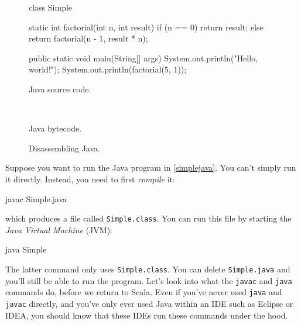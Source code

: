 \begin{figure}
\begin{minipage}{0.45\textwidth}
\begin{javacode}
class Simple {

  static int factorial(int n, int result) {
    if (n == 0) {
      return result;
    }
    else {
      return factorial(n - 1, result * n);
    }
  }

  public static void main(String[] args) {
    System.out.println("Hello, world!");
     System.out.println(factorial(5, 1));
  }

}
\end{javacode}
\caption{Java source code.}
\label{simplejava}
\end{minipage}
~\vrule~
\begin{minipage}{0.45\textwidth}
\caption{Java bytecode.}
\label{javabytecode}
\end{minipage}
\caption{Disassembling Java.}
\end{figure}

Suppose you want to run the Java program in \cref{simplejava}. You
can't simply run it directly. Instead, you need to first
\emph{compile} it:
\begin{console}
javac Simple.java
\end{console}
which produces a file called \verb|Simple.class|. You can run this file by starting
the \emph{Java Virtual Machine} (JVM):
\begin{console}
java Simple
\end{console}
The latter command only uses \verb|Simple.class|. You can delete \verb|Simple.java| and
you'll still be able to run the program. Let's look into what the \verb|javac| and
\verb|java| commands do, before we return to Scala. Even if you've never used \verb|java| and \verb|javac| directly, and you've
only ever used Java within an IDE such as Eclipse or IDEA, you should know that these
IDEs run these commands under the hood.

